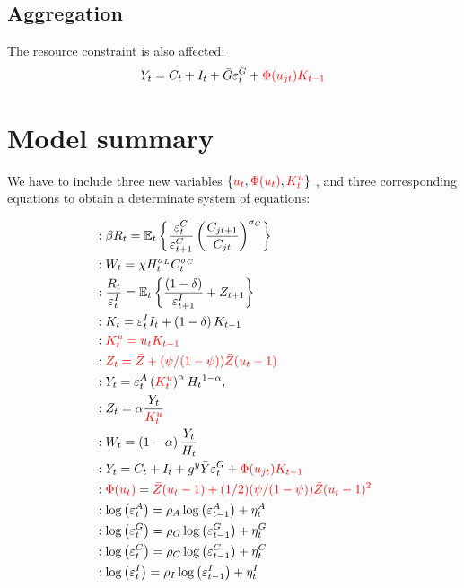 \documentclass{article}%
\begin{document}
\subsection{Aggregation}

The resource constraint is also affected:%
\[
Y_{t}=C_{t}+I_{t}+\bar{G}\varepsilon_{t}^{G}%
+\textcolor{red}{\Phi(u_{jt})K_{t-1}}
\]


\section{Model summary}

We have to include three new variables
$\{\textcolor{red}{u_{t}},\textcolor{red}{\Phi(u_{t})},\textcolor{red}{K_{t}^{u}}\}$%
, and three corresponding equations to obtain a determinate system of equations:%

\begin{align*}
&  :\beta R_{t}=\mathbb{E}_{t}\left\{  \frac{\varepsilon_{t}^{C}}%
{\varepsilon_{t+1}^{C}}\left(  \frac{C_{jt+1}}{C_{jt}}\right)  ^{\sigma_{C}%
}\right\} \\
&  :W_{t}=\chi H_{t}^{\sigma_{L}}C_{t}^{\sigma_{C}}\\
&  :\frac{R_{t}}{\varepsilon_{t}^{I}}=\mathbb{E}_{t}\left\{  \frac{\left(
1-\delta\right)  }{\varepsilon_{t+1}^{I}}+Z_{t+1}\right\} \\
&  :K_{t}=\varepsilon_{t}^{I}I_{t}+\left(  1-\delta\right)  K_{t-1}\\
&  :\textcolor{red}{K_{t}^{u}=u_{t}K_{t-1}}\\
&  :\textcolor{red}{Z_{t}=\bar{Z}+(\psi/(1-\psi))\bar{Z}(u_{t}-1)}\\
&  :Y_{t}=\varepsilon_{t}^{A}\left(  \textcolor{red}{K_{t}^{u}}\right)
^{\alpha}H_{t}{}^{1-\alpha},\\
&  :Z_{t}=\alpha\frac{Y_{t}}{\textcolor{red}{K_{t}^{u}}}\\
&  :W_{t}=\left(  1-\alpha\right)  \frac{Y_{t}}{H_{t}}\\
&  :Y_{t}=C_{t}+I_{t}+g^{y}\bar{Y}\varepsilon_{t}^{G}%
+\textcolor{red}{\Phi(u_{jt})K_{t-1}}\\
&
:\textcolor{red}{\Phi(u_{t})}=\textcolor{red}{\bar{Z}(u_{t}-1)+(1/2)(\psi/(1-\psi))\bar{Z}(u_{t}-1)^2}\\
&  :\log\left(  \varepsilon_{t}^{A}\right)  =\rho_{A}\log\left(
\varepsilon_{t-1}^{A}\right)  +\eta_{t}^{A}\\
&  :\log\left(  \varepsilon_{t}^{G}\right)  =\rho_{G}\log\left(
\varepsilon_{t-1}^{G}\right)  +\eta_{t}^{G}\\
&  :\log\left(  \varepsilon_{t}^{C}\right)  =\rho_{C}\log\left(
\varepsilon_{t-1}^{C}\right)  +\eta_{t}^{C}\\
&  :\log\left(  \varepsilon_{t}^{I}\right)  =\rho_{I}\log\left(
\varepsilon_{t-1}^{I}\right)  +\eta_{t}^{I}%
\end{align*}
\end{document}
